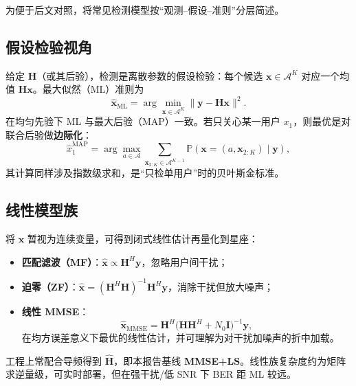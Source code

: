 为便于后文对照，将常见检测模型按“观测--假设--准则”分层简述。

\subsection{假设检验视角}
给定 $\mathbf{H}$（或其后验），检测是离散参数的假设检验：每个候选 $\mathbf{x}\in\mathcal{A}^K$ 对应一个均值 $\mathbf{H}\mathbf{x}$。最大似然（ML）准则为
\begin{equation}
\hat{\mathbf{x}}_{\mathrm{ML}}
=\arg\min_{\mathbf{x}\in\mathcal{A}^K}\|\mathbf{y}-\mathbf{H}\mathbf{x}\|^2.
\label{eq:ml}
\end{equation}
在均匀先验下 ML 与最大后验（MAP）一致。若只关心某一用户 $x_1$，则最优是对联合后验做\textbf{边际化}：
\begin{equation}
\hat x_1^{\mathrm{MAP}}
=\arg\max_{a\in\mathcal{A}}
\sum_{\mathbf{x}_{2:K}\in\mathcal{A}^{K-1}}
\mathbb{P}(\mathbf{x}=(a,\mathbf{x}_{2:K})\mid\mathbf{y}),
\end{equation}
其计算同样涉及指数级求和，是“只检单用户”时的贝叶斯金标准。

\subsection{线性模型族}
将 $\mathbf{x}$ 暂视为连续变量，可得到闭式线性估计再量化到星座：
\begin{itemize}
  \item \textbf{匹配滤波（MF）}：$\hat{\mathbf{x}}\propto \mathbf{H}^H\mathbf{y}$，忽略用户间干扰；
  \item \textbf{迫零（ZF）}：$\hat{\mathbf{x}}=(\mathbf{H}^H\mathbf{H})^{-1}\mathbf{H}^H\mathbf{y}$，消除干扰但放大噪声；
  \item \textbf{线性 MMSE}：
  \begin{equation}
  \hat{\mathbf{x}}_{\mathrm{MMSE}}
  =\mathbf{H}^H\big(\mathbf{H}\mathbf{H}^H+N_0\mathbf{I}\big)^{-1}\mathbf{y},
  \end{equation}
  在均方误差意义下最优的线性估计，并可理解为对干扰加噪声的折中加载\cite{kay1993,tse2005}。
\end{itemize}
工程上常配合导频得到 $\hat{\mathbf{H}}$，即本报告基线 \textbf{MMSE+LS}。线性族复杂度约为矩阵求逆量级，可实时部署，但在强干扰/低 SNR 下 BER 距 ML 较远。

